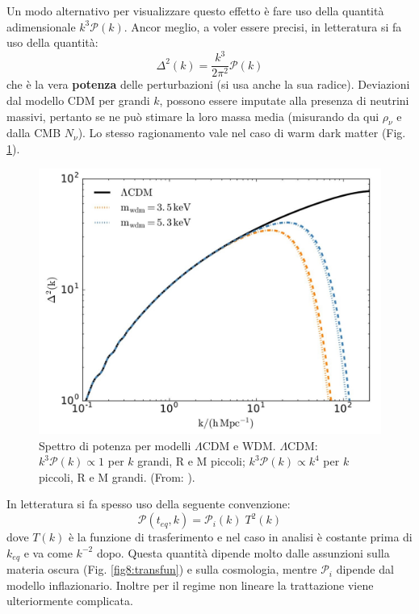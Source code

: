 Un modo alternativo per visualizzare questo effetto è fare uso della quantità adimensionale $k^3\mathcal{P}(k)$. Ancor meglio, a voler essere precisi, in letteratura si fa uso della quantità:
\begin{equation}
    \Delta^2(k) = \frac{k^3}{2\pi^2}\mathcal{P}(k)
\end{equation}
che è la vera \textbf{potenza} delle perturbazioni (si usa anche la sua radice). Deviazioni dal modello CDM per grandi $k$, possono essere imputate alla presenza di neutrini massivi, pertanto se ne può stimare la loro massa media (misurando da qui $\rho_\nu$ e dalla CMB $N_\nu$). Lo stesso ragionamento vale nel caso di warm dark matter (Fig. \ref{fig8:bella4}).


\begin{figure}[H]
    \centering
    \includegraphics[width=.57 \textwidth]{Pictures/8/tris4.jpg}
    \caption{Spettro di potenza per modelli $\Lambda$CDM e WDM. $\Lambda$CDM: $k^3\mathcal{P}(k)\propto 1$ per $k$ grandi, R e M piccoli; $k^3\mathcal{P}(k)\propto k^4$ per $k$ piccoli, R e M grandi.  (From: \cite{Hip_lito_Ricaldi_2018}).} \label{fig8:bella4}
\end{figure}

\begin{example} 
    In letteratura si fa spesso uso della seguente convenzione:
    \begin{equation}
        \mathcal{P}(t_{eq},k)=\mathcal{P}_i(k)\; T^2(k)
    \end{equation}
    dove $T(k)$ è la funzione di trasferimento e nel caso in analisi è costante prima di $k_{eq}$ e va come $k^{-2}$ dopo. Questa quantità dipende molto dalle assunzioni sulla materia oscura (Fig. \ref{fig8:transfun}) e sulla cosmologia, mentre $\mathcal{P}_i$ dipende dal modello inflazionario. Inoltre per il regime non lineare la trattazione viene ulteriormente complicata.

\end{example}

